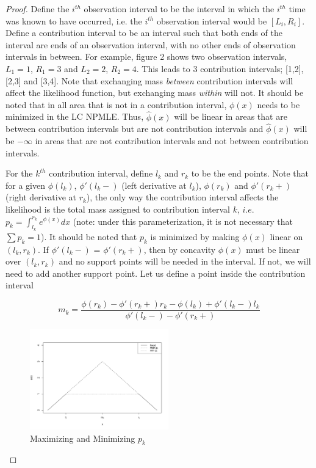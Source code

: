 \documentclass[10pt]{article}
\begin{document}
	\begin{proof}

	Define the $i^{th}$ observation interval to be the interval in which the $i^{th}$ time was known to have occurred, i.e. the $i^{th}$ observation interval would be $[L_i, R_i]$. Define a contribution interval to be an interval such that both ends of the interval are ends of an observation interval, with no other ends of observation intervals in between. For example, figure 2 shows two observation intervals, $L_1 = 1$, $R_1 = 3$ and $L_2 = 2$, $R_2 = 4$. This leads to 3 contribution intervals; [1,2], [2,3] and [3,4]. Note that exchanging mass \emph{between} contribution intervals will affect the likelihood function, but exchanging mass \emph{within} will not. It should be noted that in all area that is not in a contribution interval, $\phi(x)$ needs to be minimized in the LC NPMLE. Thus, $\hat \phi(x)$ will be linear in areas that are between contribution intervals but are not contribution intervals and $\hat \phi(x)$ will be $-\infty$ in areas that are not contribution intervals and not between contribution intervals. 

	For the $k^{th}$ contribution interval, define $l_k$ and $r_k$ to be the end points. Note that for a given $\phi(l_k)$, $\phi'(l_k -)$ (left derivative at $l_k$), $\phi(r_k)$ and $\phi'(r_k+)$ (right derivative at $r_k$), the only way the contribution interval affects the likelihood is the total mass assigned to contribution interval $k$, $i.e.$ $p_k = \int_{l_k}^{r_k} e^ {\phi(x)} dx$ (note: under this parameterization, it is not necessary that $\sum p_k = 1$). It should be noted that $p_k$ is minimized by making $\phi(x)$ linear on $(l_k, r_k)$. If $\phi'(l_k - )$ = $\phi'(r_k + )$, then by concavity $\phi(x)$ must be linear over $(l_k, r_k)$ and no support points will be needed in the interval. If not, we will need to add another support point. Let us define a point inside the contribution interval 

	
	\[ m_k = \frac{\phi(r_k) - \phi'(r_k + ) r_k - \phi(l_k) + \phi'(l_k - ) l_k} { \phi'(l_k - ) - \phi'(r_k + )}
	\]

\begin{figure}[h]
\centerline{\includegraphics[width = 6cm]{maxminpk.pdf}}
\caption{Maximizing and Minimizing $p_k$}
\end{figure}		
	

\end{proof}
\end{document}

